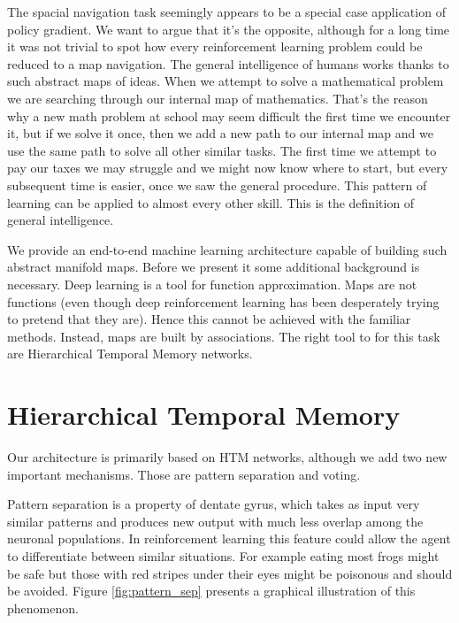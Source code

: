 \documentclass[12pt]{article}
\begin{document}
The spacial navigation task seemingly appears to be a special case application of policy gradient. We want to argue that it's the opposite, although for a long time it was not trivial to spot how every reinforcement learning problem could be reduced to a map navigation. The general intelligence of humans works thanks to such abstract maps of ideas. When we attempt to solve a mathematical problem we are searching through our internal map of mathematics. That's the reason why a new math problem at school may seem difficult the first time we encounter it, but if we solve it once, then we add a new path to our internal map and we use the same path to solve all other similar tasks. The first time we attempt to pay our taxes we may struggle and we might now know where to start, but every subsequent time is easier, once we saw the general procedure. This pattern of learning can be applied to almost every other skill. This is the definition of general intelligence.

We provide an end-to-end  machine learning architecture capable of  building such abstract manifold maps. Before we present it some additional background is necessary. Deep learning is a tool for function approximation. Maps are not functions (even though deep reinforcement learning has been desperately trying to pretend that they are). Hence this cannot be achieved with the familiar methods. Instead, maps are built by associations. The right tool to for this task are Hierarchical Temporal Memory networks.

\section{Hierarchical Temporal Memory} 

Our architecture is primarily based on HTM networks, although we add two new important mechanisms. Those are pattern separation and voting. 

Pattern separation is a property of dentate gyrus, which takes as input very similar patterns and produces new output with much less overlap among the neuronal populations. In reinforcement learning this feature could allow the agent to differentiate between similar situations. For example eating most frogs might be safe but those with red stripes under their eyes might be poisonous and should be avoided. Figure \ref{fig:pattern_sep} presents a graphical illustration of this phenomenon. 
\end{document}
